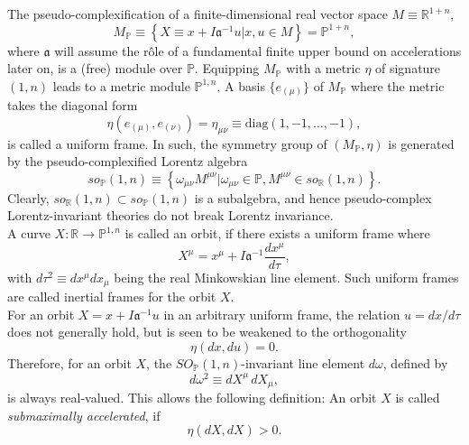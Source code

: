 \documentclass[a4paper,aps,prd,showkeys,showpacs,superscriptaddress,preprint]{revtex4}
\newcommand{\pc}{\mathbb{P}}
\newcommand{\reals}{\mathbb{R}}
\begin{document}
The pseudo-complexification of a finite-dimensional real vector space $M\equiv
\reals^{1+n}$,
\begin{equation}
  M_\pc \equiv \left\{ X \equiv x + I \mathfrak{a}^{-1} u | x,u \in M \right\} = \pc^{1+n},
\end{equation}
where $\mathfrak{a}$ will assume the r\^ole of a fundamental finite
upper bound on accelerations later on,
is a (free) module over $\pc$. Equipping $M_\pc$ with a metric
$\eta$ of signature $(1,n)$ leads to a metric module $\pc^{1,n}$.
A basis $\{e_{(\mu)}\}$ of $M_\pc$ where the metric takes the diagonal
form
\begin{equation}
  \eta(e_{(\mu)},e_{(\nu)}) = \eta_{\mu\nu} \equiv
  \textrm{diag}(1, -1, \dots, -1),
\end{equation}
is called a uniform frame. In such, the symmetry group of
$(M_\pc,\eta)$ is generated by the pseudo-complexified Lorentz algebra
\begin{equation}
  so_\pc(1,n) \equiv \left\{ \omega_{\mu\nu} M^{\mu\nu} | \omega_{\mu\nu} \in \pc, M^{\mu\nu} \in
  so_\reals(1,n)\right\}.
\end{equation}
Clearly, $so_\reals(1,n) \subset so_\pc(1,n)$ is a subalgebra, and
hence pseudo-complex Lorentz-invariant theories do not break
Lorentz invariance.\\
A curve $X: \reals \longrightarrow \pc^{1,n}$ is called an orbit, if
there exists a uniform frame where
\begin{equation}
  X^\mu = x^\mu + I \mathfrak{a}^{-1} \frac{dx^\mu}{d\tau},
\end{equation}
with $d\tau^2 \equiv dx^\mu dx_\mu$ being the real Minkowskian line
element. Such uniform frames are called inertial frames for the orbit $X$.\\
For an orbit $X= x + I \mathfrak{a}^{-1} u$ in an arbitrary uniform frame,
the relation $u = dx/d\tau$ does not generally hold, but is seen 
\cite{Schuller:2002fn} to be
weakened to the orthogonality 
\begin{equation}\label{uaortho}
  \eta(dx,du) = 0.
\end{equation}
Therefore, for an orbit $X$, the $SO_\pc(1,n)$-invariant line element
$d\omega$, defined by
\begin{equation}\label{domega}
  d\omega^2 \equiv dX^\mu\, dX_\mu,
\end{equation}
is always real-valued. This allows the following definition:
An orbit $X$ is called \textsl{submaximally accelerated}, if
\begin{equation}\label{submaxacc}
  \eta(dX,dX) > 0.
\end{equation}
\end{document}

